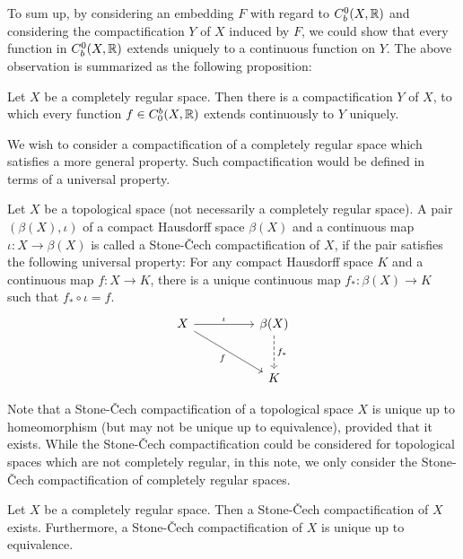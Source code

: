 To sum up, by considering an embedding $F$ with regard to $C_b^0(X, {\mathbb{R}})$ and considering the compactification $Y$ of $X$ induced by $F$, we could show that every function in $C_b^0(X, {\mathbb{R}})$ extends uniquely to a continuous function on $Y$.
The above observation is summarized as the following proposition:
\begin{prop}\label{SC-cptf_ver1}
    Let $X$ be a completely regular space.
    Then there is a compactification $Y$ of $X$, to which every function $f\in C_0^b(X, {\mathbb{R}})$ extends continuously to $Y$ uniquely.
\end{prop}

We wish to consider a compactification of a completely regular space which satisfies a more general property.
Such compactification would be defined in terms of a universal property.

\begin{defi}\label{SC-cptf}
    Let $X$ be a topological space (not necessarily a completely regular space).
    A pair $(\beta(X), \iota)$ of a compact Hausdorff space $\beta(X)$ and a continuous map $\iota: X\rightarrow \beta(X)$ is called a Stone-\v{C}ech compactification of $X$, if the pair satisfies the following universal property:
    For any compact Hausdorff space $K$ and a continuous map $f: X\rightarrow K$, there is a unique continuous map $f_*: \beta(X)\rightarrow K$ such that $f_*\circ\iota = f$.
    \begin{equation*}
        \begin{tikzcd}[row sep=large, column sep=huge]
            X
            \arrow[dr, "f"']
            \arrow[r, "\iota"] &
            \beta(X)
            \arrow[d, "f_*", dashed] \\
            & K
        \end{tikzcd}
    \end{equation*}
\end{defi}

Note that a Stone-\v{C}ech compactification of a topological space $X$ is unique up to homeomorphism (but may not be unique up to equivalence), provided that it exists.
While the Stone-\v{C}ech compactification could be considered for topological spaces which are not completely regular, in this note, we only consider the Stone-\v{C}ech compactification of completely regular spaces.
\begin{thm}
    Let $X$ be a completely regular space.
    Then a Stone-\v{C}ech compactification of $X$ exists.
    Furthermore, a Stone-\v{C}ech compactification of $X$ is unique up to equivalence.
\end{thm}

